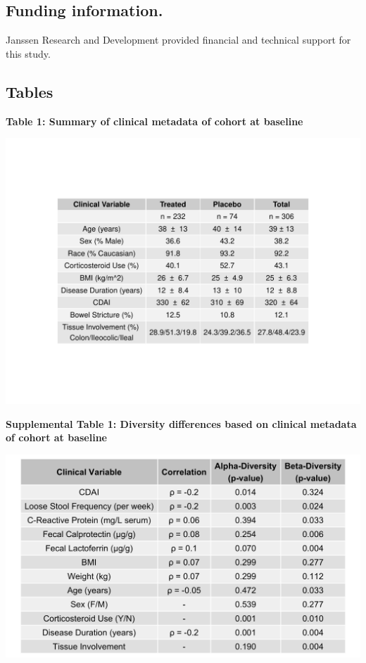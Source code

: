 \documentclass[12pt,]{article}
\begin{document}
\subsection{Funding information.}\label{funding-information.}

Janssen Research and Development provided financial and technical
support for this study.

\newpage

\subsection{Tables}\label{tables}

\textbf{Table 1: Summary of clinical metadata of cohort at baseline}

\includegraphics{tables/Table1_baseline_metadata.pdf}

\newpage

\textbf{Supplemental Table 1: Diversity differences based on clinical
metadata of cohort at baseline}

\includegraphics{tables/Supp.table1_cohortdiversity.png}
\end{document}

